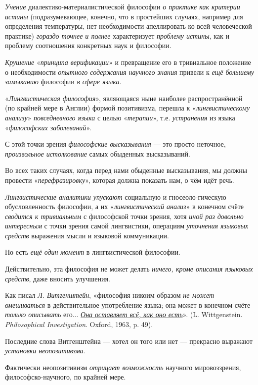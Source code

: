 \documentclass[a4paper,14pt,russian]{extreport}
\begin{document}
\emph{Учение} диалектико-материалистической философии \emph{о практике как критерии истины} (подразумевающее, конечно, что в простейших случаях, например для определения температуры, нет необходимости апеллировать ко всей человеческой практике) \emph{гораздо точнее и полнее} характеризует \emph{проблему истины}, как и проблему соотношения конкретных наук и философии.

\emph{Крушение} «\emph{принципа верификации}» и превращение его в тривиальное положение о необходимости \emph{опытного содержания научного знания} привели к \emph{ещё большему замыканию} философии в \emph{сфере языка}.

«\emph{Лингвистическая философия}», являющаяся ныне наиболее распространённой (по крайней мере в Англии) формой позитивизма, перешла к «\emph{лингвистическому анализу}» \emph{повседневного языка} с целью «\emph{терапии}», т.е. \emph{устранения} из языка «\emph{философских заболеваний}».

С этой точки зрения \emph{философские высказывания} --- это просто неточное, \emph{произвольное истолкование} самых обыденных высказываний.

Во всех таких случаях, когда перед нами обыденные высказывания, мы должны провести «\emph{перефразировку}», которая должна показать нам, о чём идёт речь.

\emph{Лингвистические аналитики упускают} социальную и гносеоло-гическую обусловленность философии, а их «\emph{лингвистический анализ}» в конечном счёте \emph{сводится к тривиальным} с философской точки зрения, хотя \emph{иной раз довольно интересным} с точки зрения самой лингвистики, операциям \emph{уточнения языковых средств} выражения мысли и языковой коммуникации.

Но есть \emph{ещё один момент} в лингвистической философии.

Действительно, эта философия не может делать \emph{ничего, кроме описания языковых средств}, даже вносить улучшения.

Как писал \emph{Л. Витгенштейн}, «философия никоим образом \emph{не может вмешиваться} в действительное употребление языка; она может в конечном счёте \emph{только описывать} его... \emph{\underline{Она оставляет всё, как оно есть}}». (L. Wittgenstein. \emph{Philosophical Investigation}. Oxford, 1963, p. 49).

Последние слова Витгенштейна --- хотел он того или нет --- прекрасно выражают \emph{установки неопозитивзма}.

Фактически неопозитивизм \emph{отрицает возможность} научного мировоззрения, философско-научного, по крайней мере.
\end{document}
